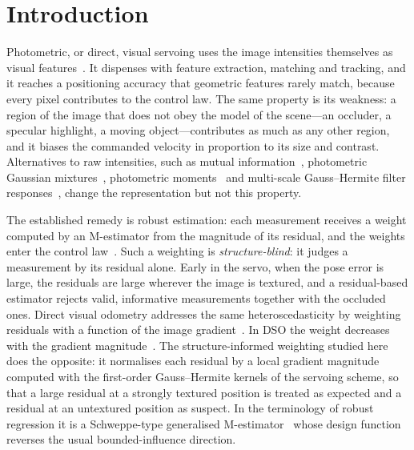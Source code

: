 \documentclass[preprint,12pt]{elsarticle}
\theoremstyle{remark}
\begin{document}
\section{Introduction}
\label{sec:intro}

Photometric, or direct, visual servoing uses the image intensities themselves
as visual features~\cite{collewet2008setfree,collewet2011photometric}. It
dispenses with feature extraction, matching and tracking, and it reaches a
positioning accuracy that geometric features rarely match, because every pixel
contributes to the control law. The same property is its weakness: a region
of the image that does not obey the model of the scene---an occluder, a
specular highlight, a moving object---contributes as much as any other region,
and it biases the commanded velocity in proportion to its size and contrast.
Alternatives to raw intensities, such as mutual information~\cite{dame2011mutual},
photometric Gaussian mixtures~\cite{crombez2019pgm}, photometric
moments~\cite{bakthavatchalam2018moments} and multi-scale Gauss--Hermite filter
responses~\cite{herpvs}, change the representation but not this property.

The established remedy is robust estimation: each measurement receives a weight
computed by an M-estimator from the magnitude of its residual, and the weights
enter the control law~\cite{comport2006robust,malis2006robust}. Such a weighting
is \emph{structure-blind}: it judges a measurement by its residual alone. Early
in the servo, when the pose error is large, the residuals are large wherever
the image is textured, and a residual-based estimator rejects valid,
informative measurements together with the occluded ones. Direct visual
odometry addresses the same heteroscedasticity by weighting residuals with a
function of the image gradient~\cite{engel2014lsd,engel2018dso}. In DSO the
weight decreases with the gradient magnitude~\cite{engel2018dso}. The
structure-informed weighting studied here does the opposite: it normalises
each residual by a local gradient magnitude computed with the first-order
Gauss--Hermite kernels of the servoing scheme, so that a large residual at a
strongly textured position is treated as expected and a residual at an
untextured position as suspect. In the terminology of robust regression it is
a Schweppe-type generalised M-estimator~\cite{handschin1975bad,hampel1986robust}
whose design function reverses the usual bounded-influence direction.
\end{document}
